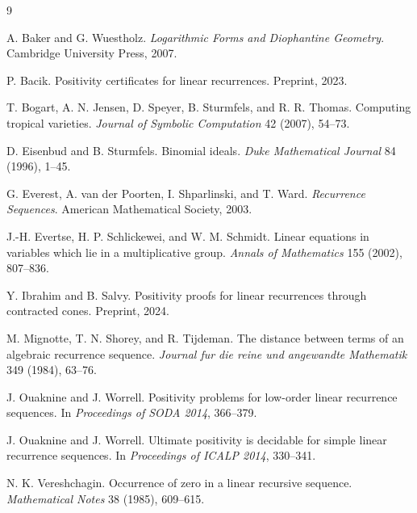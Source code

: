 \documentclass[11pt]{article}
\begin{document}
\begin{thebibliography}{9}

A. Baker and G. Wuestholz.
\newblock \emph{Logarithmic Forms and Diophantine Geometry}.
\newblock Cambridge University Press, 2007.

P. Bacik.
\newblock Positivity certificates for linear recurrences.
\newblock Preprint, 2023.

T. Bogart, A. N. Jensen, D. Speyer, B. Sturmfels, and R. R. Thomas.
\newblock Computing tropical varieties.
\newblock \emph{Journal of Symbolic Computation} 42 (2007), 54--73.

D. Eisenbud and B. Sturmfels.
\newblock Binomial ideals.
\newblock \emph{Duke Mathematical Journal} 84 (1996), 1--45.

G. Everest, A. van der Poorten, I. Shparlinski, and T. Ward.
\newblock \emph{Recurrence Sequences}.
\newblock American Mathematical Society, 2003.

J.-H. Evertse, H. P. Schlickewei, and W. M. Schmidt.
\newblock Linear equations in variables which lie in a multiplicative group.
\newblock \emph{Annals of Mathematics} 155 (2002), 807--836.

Y. Ibrahim and B. Salvy.
\newblock Positivity proofs for linear recurrences through contracted cones.
\newblock Preprint, 2024.

M. Mignotte, T. N. Shorey, and R. Tijdeman.
\newblock The distance between terms of an algebraic recurrence sequence.
\newblock \emph{Journal fur die reine und angewandte Mathematik} 349 (1984), 63--76.

J. Ouaknine and J. Worrell.
\newblock Positivity problems for low-order linear recurrence sequences.
\newblock In \emph{Proceedings of SODA 2014}, 366--379.

J. Ouaknine and J. Worrell.
\newblock Ultimate positivity is decidable for simple linear recurrence sequences.
\newblock In \emph{Proceedings of ICALP 2014}, 330--341.

N. K. Vereshchagin.
\newblock Occurrence of zero in a linear recursive sequence.
\newblock \emph{Mathematical Notes} 38 (1985), 609--615.

\end{thebibliography}
\end{document}
